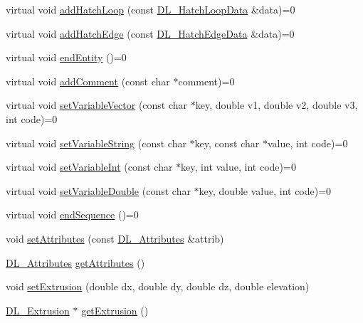 \begin{DoxyCompactItemize}
\item 
virtual void \hyperlink{classDL__CreationInterface_a8fadafd0dbb1c139a58b7d053af37de0}{add\-Hatch\-Loop} (const \hyperlink{structDL__HatchLoopData}{D\-L\-\_\-\-Hatch\-Loop\-Data} \&data)=0
\item 
virtual void \hyperlink{classDL__CreationInterface_a07395d439b319d1ee9dcc933205d5095}{add\-Hatch\-Edge} (const \hyperlink{structDL__HatchEdgeData}{D\-L\-\_\-\-Hatch\-Edge\-Data} \&data)=0
\item 
virtual void \hyperlink{classDL__CreationInterface_ae338a37fc044654e77080dcb13f93c9a}{end\-Entity} ()=0
\item 
virtual void \hyperlink{classDL__CreationInterface_a7dc5362faf3264e11304000c0950093b}{add\-Comment} (const char $\ast$comment)=0
\item 
virtual void \hyperlink{classDL__CreationInterface_aabafdd33ec77857b2f0d0ec50d9d545d}{set\-Variable\-Vector} (const char $\ast$key, double v1, double v2, double v3, int code)=0
\item 
virtual void \hyperlink{classDL__CreationInterface_a904841c6cdf0b5fcf4c41ff417c51510}{set\-Variable\-String} (const char $\ast$key, const char $\ast$value, int code)=0
\item 
virtual void \hyperlink{classDL__CreationInterface_a024464f71744e2fd0d9f639f53f138c2}{set\-Variable\-Int} (const char $\ast$key, int value, int code)=0
\item 
virtual void \hyperlink{classDL__CreationInterface_a34e63296b695068188cb4ff6d0d17d89}{set\-Variable\-Double} (const char $\ast$key, double value, int code)=0
\item 
virtual void \hyperlink{classDL__CreationInterface_a8b7558ec21f8e93c5ff12aadcdbc72e1}{end\-Sequence} ()=0
\item 
void \hyperlink{classDL__CreationInterface_a353e2765a235a1eff0fc1ae1a7a371cb}{set\-Attributes} (const \hyperlink{classDL__Attributes}{D\-L\-\_\-\-Attributes} \&attrib)
\item 
\hyperlink{classDL__Attributes}{D\-L\-\_\-\-Attributes} \hyperlink{classDL__CreationInterface_a7931be0007cc98f5bec32a46179af6dc}{get\-Attributes} ()
\item 
void \hyperlink{classDL__CreationInterface_a9ae40ae05959e45c89afc4f75012e4e2}{set\-Extrusion} (double dx, double dy, double dz, double elevation)
\item 
\hyperlink{classDL__Extrusion}{D\-L\-\_\-\-Extrusion} $\ast$ \hyperlink{classDL__CreationInterface_a8f0f3c5452ba71d48d30718fb331ab72}{get\-Extrusion} ()
\end{DoxyCompactItemize}
